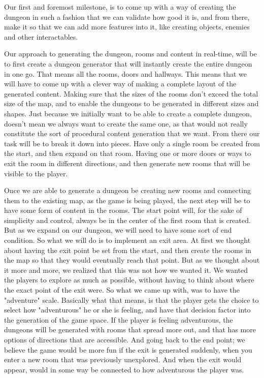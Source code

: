 \documentclass[conference,compsoc]{IEEEtran}
\begin{document}
Our first and foremost milestone, is to come up with a way of creating the dungeon in such a fashion that we can validate how good it is, and from there, make it so that we can add more features into it, like creating objects, enemies and other interactables. 

Our approach to generating the dungeon, rooms and content in real-time, will be to first create a dungeon generator that will instantly create the entire dungeon in one go. That means all the rooms, doors and hallways. This means that we will have to come up with a clever way of making a complete layout of the generated content. Making sure that the sizes of the rooms don't exceed the total size of the map, and to enable the dungeons to be generated in different sizes and shapes. Just because we initially want to be able to create a complete dungeon, doesn't mean we always want to create the same one, as that would not really constitute the sort of procedural content generation that we want. 
From there our task will be to break it down into pieces. Have only a single room be created from the start, and then expand on that room. Having one or more doors or ways to exit the room in different directions, and then generate new rooms that will be visible to the player.

Once we are able to generate a dungeon be creating new rooms and connecting them to the existing map, as the game is being played, the next step will be to have some form of content in the rooms.
The start point will, for the sake of simplicity and control, always be in the center of the first room that is created. But as we expand on our dungeon, we will need to have some sort of end condition. So what we will do is to implement an exit area. At first we thought about having the exit point be set from the start, and then create the rooms in the map so that they would eventually reach that point. But as we thought about it more and more, we realized that this was not how we wanted it. We wanted the players to explore as much as possible, without having to think about where the exact point of the exit were. So what we came up with, was to have the "adventure" scale. Basically what that means, is that the player gets the choice to select how "adventurous" he or she is feeling, and have that decision factor into the generation of the game space. If the player is feeling adventurous, the dungeons will be generated with rooms that spread more out, and that has more options of directions that are accessible. And going back to the end point; we believe the game would be more fun if the exit is generated suddenly, when you enter a new room that was previously unexplored. And when the exit would appear, would in some way be connected to how adventurous the player was.
\end{document}
